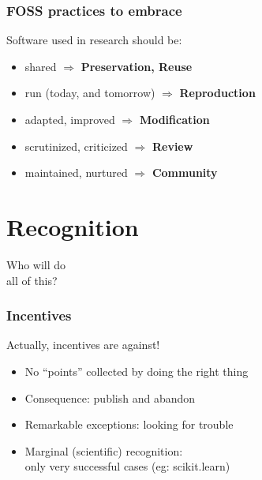\documentclass[17pt,aspectratio=169,hyperref={pdfusetitle,colorlinks,allcolors=olive}]{beamer}
\begin{document}
\begin{frame}[fragile]
  \frametitle{FOSS practices to embrace}

  Software used in research should be:
  
  \begin{itemize}
  \item shared $\Rightarrow$ \textbf{Preservation, Reuse}
  \item run (today, and tomorrow) $\Rightarrow$ \textbf{Reproduction}
  \item adapted, improved $\Rightarrow$ \textbf{Modification}
  \item scrutinized, criticized $\Rightarrow$ \textbf{Review} 
  \item maintained, nurtured $\Rightarrow$ \textbf{Community}
  \end{itemize}

\end{frame}

\section{Recognition}

\begin{frame}[fragile]

  {\Huge Who will do \\ all of this? \\}
  
\end{frame}

\begin{frame}[fragile]
  \frametitle{Incentives}

  Actually, incentives are against!
  
  \begin{itemize}
  \item No ``points'' collected by doing the right thing
  \item Consequence: publish and abandon
  \item Remarkable exceptions: looking for trouble
  \item Marginal (scientific) recognition: \\
    only very successful cases (eg: scikit.learn)
  \end{itemize}

\end{frame}
\end{document}
